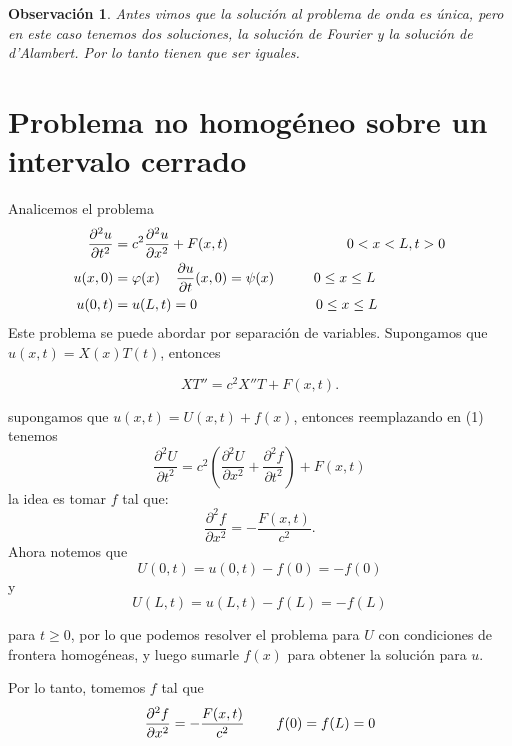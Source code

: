\documentclass[11pt]{book}
\theoremstyle{plain}
\newtheorem{obs}[proposición]{Observación}
\theoremstyle{definition}
\begin{document}
\begin{obs}
    Antes vimos que la solución al problema de onda es única, pero en este caso tenemos dos soluciones, la solución de Fourier y la solución de d'Alambert. Por lo tanto tienen que ser iguales.
\end{obs}

\section{Problema no homogéneo sobre un intervalo cerrado}
Analicemos el problema
\setcounter{equation}{0}
\begin{align}
    \frac{\partial^2 u}{\partial t^2} &= c^2 \frac{\partial^2 u}{\partial x^2} + F(x,t) \hspace{30mm} 0<x<L, t > 0\\ 
    u(x,0)&= \varphi(x) \hspace{4mm} \frac{\partial u}{\partial t}(x,0) = \psi(x)  \hspace{10mm} 0\leq x\leq L\\
    u(0,t)&= u(L,t) = 0  \hspace{30mm} 0\leq x\leq L
\end{align}
Este problema se puede abordar por separación de variables. Supongamos que $u(x,t) = X(x)T(t)$, entonces

\[
XT'' = c^{2}X''T + F(x,t)
.\]

supongamos que $u(x,t) = U(x,t) + f(x)$, entonces reemplazando en (1) tenemos
\[
    \frac{\partial^2 U}{\partial t^2} = c^2 \left(\frac{\partial^2 U}{\partial x^2} + \frac{\partial^2 f}{\partial t^2}\right) + F(x,t)
\]
la idea es tomar $f$ tal que:
\[
    \frac{\partial^2 f}{\partial x^2} = -\frac{F(x,t)}{c^2}
.\]
Ahora notemos que 
\[U(0,t) = u(0,t) - f(0) = -f(0)\]
y
\[U(L,t) = u(L,t) - f(L) = -f(L)\]

para $t\geq 0$, por lo que podemos resolver el problema para $U$ con condiciones de frontera homogéneas, y luego sumarle $f(x)$ para obtener la solución para $u$.

Por lo tanto, tomemos $f$ tal que 
\[\frac{\partial^2 f}{\partial x^2} = -\frac{F(x,t)}{c^2} \hspace{8mm} f(0) = f(L) = 0\]
\end{document}
